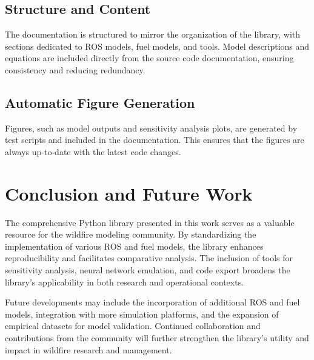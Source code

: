 \documentclass{article}
\begin{document}
	\subsection{Structure and Content}
	The documentation is structured to mirror the organization of the library, with sections dedicated to ROS models, fuel models, and tools. Model descriptions and equations are included directly from the source code documentation, ensuring consistency and reducing redundancy.
	
	\subsection{Automatic Figure Generation}
	Figures, such as model outputs and sensitivity analysis plots, are generated by test scripts and included in the documentation. This ensures that the figures are always up-to-date with the latest code changes.
	
	\section{Conclusion and Future Work}
	The comprehensive Python library presented in this work serves as a valuable resource for the wildfire modeling community. By standardizing the implementation of various ROS and fuel models, the library enhances reproducibility and facilitates comparative analysis. The inclusion of tools for sensitivity analysis, neural network emulation, and code export broadens the library's applicability in both research and operational contexts.
	
	Future developments may include the incorporation of additional ROS and fuel models, integration with more simulation platforms, and the expansion of empirical datasets for model validation. Continued collaboration and contributions from the community will further strengthen the library's utility and impact in wildfire research and management.
	
\end{document}
